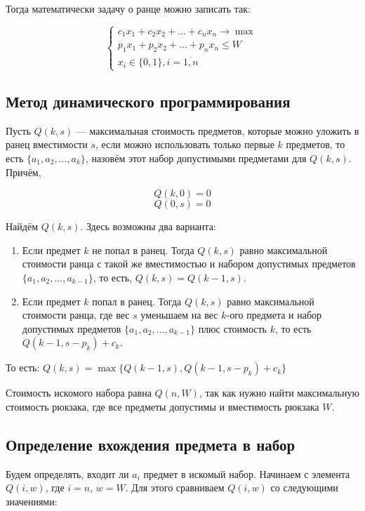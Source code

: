 Тогда математически задачу о ранце можно записать так:

$$
\left\{
\begin{aligned}
c_1 x_1 + c_2 x_2 + ... + c_n x_n \to \max \\
p_1 x_1 + p_2 x_2 + ... + p_n x_n \le W \\
x_i \in \{0, 1\}, i = \overline{1, n}
\end{aligned}
\right.
$$

\subsection*{Метод динамического программирования}

Пусть $Q(k,s)$ --- максимальная стоимость предметов, которые можно уложить в ранец вместимости $s$, если можно использовать только первые $k$ предметов, то есть $\{a_1, a_2, ..., a_k\}$, назовём этот набор допустимыми предметами для $Q(k,s)$. Причём,

$$Q(k, 0) = 0$$
$$Q(0, s) = 0$$

Найдём $Q(k, s)$. Здесь возможны два варианта:

\begin{enumerate}
\item{Если предмет $k$ не попал в ранец. Тогда $Q(k,s)$ равно максимальной стоимости ранца с такой же вместимостью и набором допустимых предметов $\{a_1, a_2, ..., a_{k-1}\}$, то есть, $Q(k,s) = Q(k-1,s)$.}
\item{Если предмет $k$ попал в ранец. Тогда $Q(k, s)$ равно максимальной стоимости ранца, где вес $s$ уменьшаем на вес $k$-ого предмета и набор допустимых предметов $\{a_1, a_2, ..., a_{k-1}\}$ плюс стоимость $k$, то есть $Q(k-1, s-p_k) + c_k$.}
\end{enumerate}

То есть: $Q(k, s) = \max{\{Q(k-1, s), Q(k-1, s- p_k) + c_k\}}$

Стоимость искомого набора равна $Q(n, W)$, так как нужно найти максимальную стоимость рюкзака, где все предметы допустимы и вместимость рюкзака $W$.

\subsection*{Определение вхождения предмета в набор}

Будем определять, входит ли $a_i$ предмет в искомый набор. Начинаем с элемента $Q(i, w)$, где $i = n$, $w = W$. Для этого сравниваем $Q(i, w)$ со следующими значениями:

